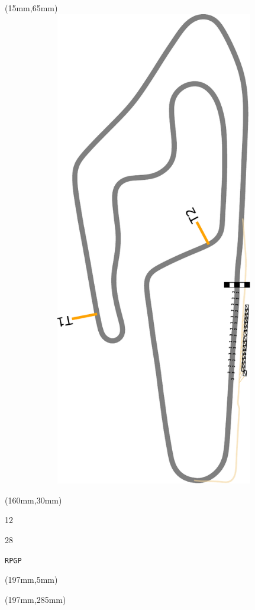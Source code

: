 \begin{textblock*}{185mm}(15mm,65mm)%
\centering
\mbox{\includegraphics[width=185mm,height=210mm,keepaspectratio]{PT/RPGP.pdf}}
\end{textblock*}
\begin{textblock*}{40mm}(160mm,30mm)%
\Large
\par{} 
\par12 
\par28 
\par\hfill\tiny\tt RPGP\\
\end{textblock*}
\begin{textblock*}{20mm}(197mm,5mm)%
\fbox{\thepage}
\label{RPGP}
\end{textblock*}
\begin{textblock*}{20mm}(197mm,285mm)%
\fbox{\thepage}
\end{textblock*}

